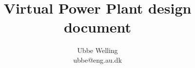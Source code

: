 \documentclass{report}
\begin{document}
\title{Virtual Power Plant design document}
\author{Ubbe Welling\\ubbe@eng.au.dk}

\maketitle

\setcounter{tocdepth}{1}
\tableofcontents






\end{document}

